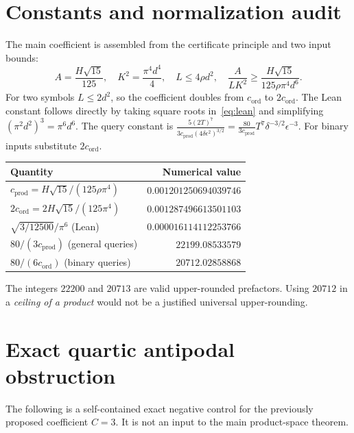 \documentclass[11pt]{article}
\numberwithin{equation}{section}
\theoremstyle{remark}
\newcommand{\cprod}{c_{\mathrm{prod}}}
\newcommand{\cord}{c_{\mathrm{ord}}}
\begin{document}
\appendix
\section{Constants and normalization audit}\label{app:constants}
The main coefficient is assembled from the certificate principle and two input bounds:
\[
 A=\frac{H\sqrt{15}}{125},\quad K^2=\frac{\pi^4d^4}{4},\quad
 L\le4\rho d^2,\quad \frac{A}{LK^2}\ge\frac{H\sqrt{15}}{125\rho\pi^4d^6}.
\]
For two symbols $L\le2d^2$, so the coefficient doubles from $\cord$ to $2\cord$. The Lean constant follows directly by taking square roots in~\eqref{eq:lean} and simplifying $(\pi^2d^2)^3=\pi^6d^6$.
The query constant is $\frac{5(2T)^7}{3\cprod(4\delta\epsilon^2)^{3/2}}=\frac{80}{3\cprod}T^7\delta^{-3/2}\epsilon^{-3}$. For binary inputs substitute $2\cord$.
\begin{center}
\begin{tabular}{@{}>{\raggedright\arraybackslash}p{.48\linewidth}r@{}}\toprule
Quantity & Numerical value\\\midrule
$\cprod=H\sqrt{15}/(125\rho\pi^4)$ & $0.001201250694039746$\\
$2\cord=2H\sqrt{15}/(125\pi^4)$ & $0.001287496613501103$\\
$\sqrt{3/12500}/\pi^6$ (Lean) & $0.000016114112253766$\\
$80/(3\cprod)$ (general queries) & $22199.08533579$\\
$80/(6\cord)$ (binary queries) & $20712.02858868$\\\bottomrule
\end{tabular}
\end{center}
The integers $22200$ and $20713$ are valid upper-rounded prefactors. Using $20712$ in a \emph{ceiling of a product} would not be a justified universal upper-rounding.

\section{Exact quartic antipodal obstruction}\label{app:quartic}
The following is a self-contained exact negative control for the
previously proposed coefficient $C=3$. It is not an input to the main
product-space theorem.
\end{document}
